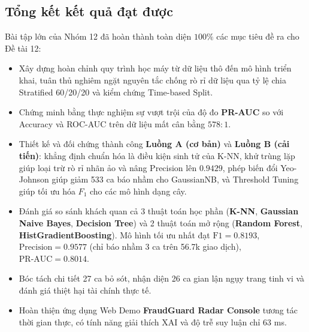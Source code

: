 \documentclass[13pt,a4paper]{extarticle}
\begin{document}
\subsection{Tổng kết kết quả đạt được}
Bài tập lớn của Nhóm 12 đã hoàn thành toàn diện $100\%$ các mục tiêu đề ra cho Đề tài 12:
\begin{itemize}
    \item Xây dựng hoàn chỉnh quy trình học máy từ dữ liệu thô đến mô hình triển khai, tuân thủ nghiêm ngặt nguyên tắc chống rò rỉ dữ liệu qua tỷ lệ chia Stratified 60/20/20 và kiểm chứng Time-based Split.
    \item Chứng minh bằng thực nghiệm sự vượt trội của độ đo \textbf{PR-AUC} so với Accuracy và ROC-AUC trên dữ liệu mất cân bằng $578 : 1$.
    \item Thiết kế và đối chứng thành công \textbf{Luồng A (cơ bản)} và \textbf{Luồng B (cải tiến)}: khẳng định chuẩn hóa là điều kiện sinh tử của K-NN, khử trùng lặp giúp loại trừ rò rỉ nhãn ảo và nâng Precision lên $0.9429$, phép biến đổi Yeo-Johnson giúp giảm 533 ca báo nhầm cho GaussianNB, và Threshold Tuning giúp tối ưu hóa $F_1$ cho các mô hình dạng cây.
    \item Đánh giá so sánh khách quan cả 3 thuật toán học phần (\textbf{K-NN}, \textbf{Gaussian Naive Bayes}, \textbf{Decision Tree}) và 2 thuật toán mở rộng (\textbf{Random Forest}, \textbf{HistGradientBoosting}). Mô hình tối ưu nhất đạt $\text{F1} = \mathbf{0.8193}$, $\text{Precision} = \mathbf{0.9577}$ (chỉ báo nhầm 3 ca trên 56.7k giao dịch), $\text{PR-AUC} = \mathbf{0.8014}$.
    \item Bóc tách chi tiết 27 ca bỏ sót, nhận diện 26 ca gian lận ngụy trang tinh vi và đánh giá thiệt hại tài chính thực tế.
    \item Hoàn thiện ứng dụng Web Demo \textbf{FraudGuard Radar Console} tương tác thời gian thực, có tính năng giải thích XAI và độ trễ suy luận chỉ 63 ms.
\end{itemize}
\end{document}
